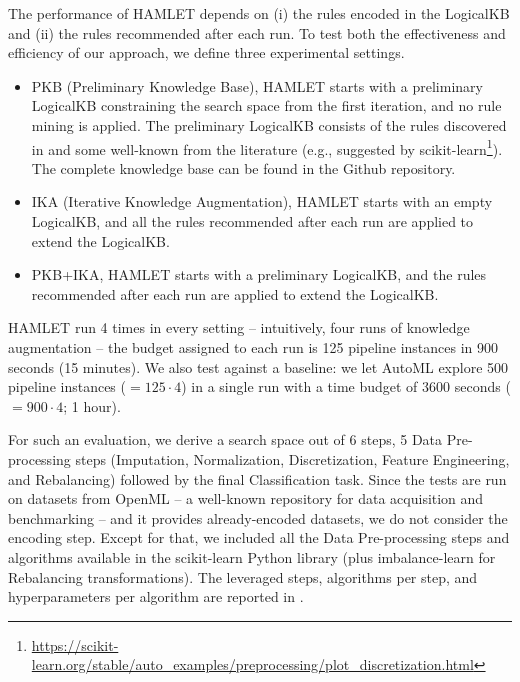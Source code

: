 The performance of HAMLET depends on (i) the rules encoded in the LogicalKB and (ii) the rules recommended after each run.
To test both the effectiveness and efficiency of our approach, we define three experimental settings.
\begin{itemize}
    \item PKB (Preliminary Knowledge Base), HAMLET starts with a preliminary LogicalKB constraining the search space from the first iteration, and no rule mining is applied.
    The preliminary LogicalKB consists of the rules discovered in \cite{giovanelli2021data} and some well-known from the literature (e.g., suggested by scikit-learn\footnote{\url{https://scikit-learn.org/stable/auto_examples/preprocessing/plot_discretization.html}}).
    The complete knowledge base can be found in the Github repository.
    \item IKA (Iterative Knowledge Augmentation), HAMLET starts with an empty LogicalKB, and all the rules recommended after each run are applied to extend the LogicalKB.
    \item PKB+IKA, HAMLET starts with a preliminary LogicalKB, and the rules recommended after each run are applied to extend the LogicalKB.
\end{itemize}
HAMLET run 4 times in every setting -- intuitively, four runs of knowledge augmentation -- the budget assigned to each run is 125 pipeline instances in 900 seconds (15 minutes).
We also test against a baseline: we let AutoML explore 500 pipeline instances ($= 125 \cdot 4$) in a single run with a time budget of 3600 seconds ($= 900 \cdot 4$; 1 hour).

For such an evaluation, we derive a search space out of 6 steps, 5 Data Pre-processing steps (Imputation, Normalization, Discretization, Feature Engineering, and Rebalancing) followed by the final Classification task.
Since the tests are run on datasets from OpenML \cite{OpenML2013} -- a well-known repository for data acquisition and benchmarking -- and it provides already-encoded datasets, we do not consider the encoding step. 
Except for that, we included all the Data Pre-processing steps and algorithms available in the scikit-learn \cite{scikit-learn} Python library (plus imbalance-learn \cite{JMLR:v18:16-365} for Rebalancing transformations).
The leveraged steps, algorithms per step, and hyperparameters per algorithm are reported in .

